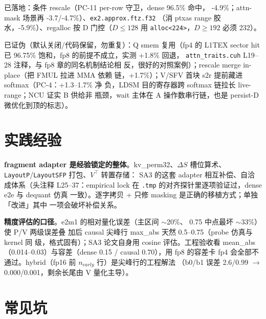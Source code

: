 已落地：条件 rescale（PC-11 per-row 守卫，dense 96.5\% 命中，
-4.9\%；attn-mask 场景再 -3.7/-4.7\%）、\texttt{ex2.approx.ftz.f32}
（消 ptxas range 胶水，-5.9\%）、regalloc 按 D 门控（$D\le128$ 用
\texttt{alloc<224>}，$D\ge192$ 必须 232）。

已证伪（默认关闭/代码保留，勿重复）：Q smem 复用（fp4 的 L1TEX
sector hit 已 96.75\% 饱和，fp8 的前提不成立，实测 +1.8\% 回退，
\texttt{attn\_traits.cuh} L19--28 注释，与 fp8 章的同名机制结论相
反，很好的对照案例）；rescale merge in-place（把 FMUL 拉进 MMA 依赖
链，+1.7\%）；V/SFV 首块 s2r 提前藏进 softmax（PC-4：+1.3--1.7\% 净
负，LDSM 目的寄存器跨 softmax 链拉长 live-range；NCU 证实 B 供给非
瓶颈，wait 主体在 A 操作数串行链，也是 persist-D 微优化到顶的标志）。

\section{实践经验}

\textbf{fragment adapter 是经验锁定的整体}。kv\_perm32、$\Delta S$
槽位算术、\texttt{LayoutP}/\texttt{LayoutSFP} 打包、$V^\top$ 转置存储：
SA3 的这套 adapter 相互补偿、自洽成体系（头注释 L25--37：empirical
lock 在 \texttt{.tmp} 的对齐探针里逐项验证过，dense e2e 与 dequant 仿真
一致）。逐字拷贝 + 只修 masking 是正确的移植方式；单独「改进」其中
一项会破坏补偿关系。

\textbf{精度评估的口径}。e2m1 的相对量化误差（主区间 $\sim$20\%、
0.75 中点最坏 $\sim$33\%）使 P/V 两级误差叠
加后 causal 尖峰行 max\_abs 天然 0.5--0.75（probe 仿真与 kernel 同
级，格式固有）；SA3 论文自身用 cosine 评估。工程验收看 mean\_abs
（0.014--0.03）与容差（dense 0.15 / causal 0.70），用 fp8 的容差卡
fp4 会全部不通过。hybrid（fp16 前 $n_{early}$ 行）是尖峰行的工程解法
（b0/b1 误差 2.6/0.99 $\to$ 0.000/0.001，剩余长尾由 V 量化主导）。

\section{常见坑}

